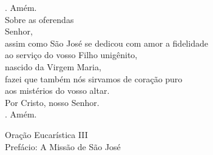 \documentclass{book}
\begin{document}
\begin{flushleft}
    {\color{VioletRed2} \Rbar.} Amém.
    \vspace{.2cm} \\
    \textcolor{VioletRed2}{Sobre as oferendas}
    \vspace{.2cm} \\
    Senhor, \\
    assim como São José se dedicou com amor a fidelidade \\
    ao serviço do vosso Filho unigênito, \\
    nascido da Virgem Maria, \\
    fazei que também nós sirvamos de coração puro \\
    aos mistérios do vosso altar. \\
    Por Cristo, nosso Senhor. \\
    {\color{VioletRed2} \Rbar.} Amém.
\end{flushleft}
\begin{center}
    \textcolor{VioletRed2}{Oração Eucarística III \\ \small Prefácio: A Missão de São José}
\end{center}
\end{document}
